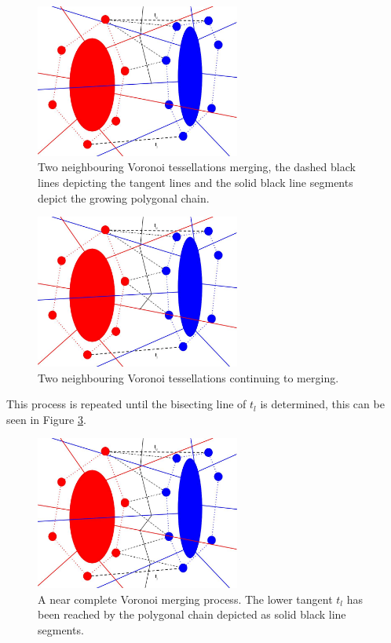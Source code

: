 \begin{figure}[H]
\centering
\includegraphics[width=0.6\textwidth]{Images/v_merge2.jpg}
\caption{Two neighbouring Voronoi tessellations merging, the dashed black lines depicting the tangent lines and the solid black line segments depict the growing polygonal chain.}
\label{fig:v_merge2}
\end{figure}
\begin{figure}[H]
\centering
\includegraphics[width=0.6\textwidth]{Images/v_merge3.jpg}
\caption{Two neighbouring Voronoi tessellations continuing to merging.}
\label{fig:v_merge3}
\end{figure}
This process is repeated until the bisecting line of $t_l$ is determined, this can be seen in Figure \ref{fig:v_merge4}.
\begin{figure}[H]
\centering
\includegraphics[width=0.6\textwidth]{Images/v_merge4.jpg}
\caption{A near complete Voronoi merging process. The lower tangent $t_l$ has been reached by the polygonal chain depicted as solid black line segments.}
\label{fig:v_merge4}
\end{figure}
